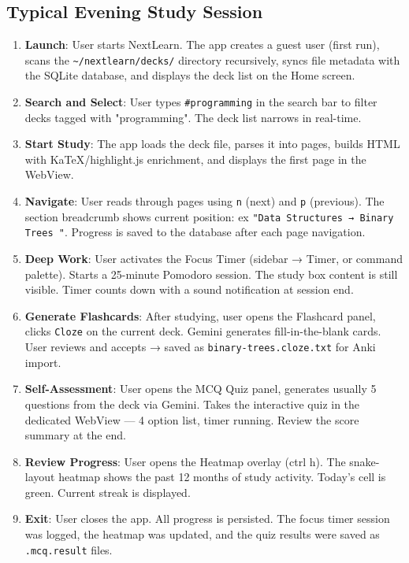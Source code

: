 \documentclass[14pt]{article}
\begin{document}
\subsection{Typical Evening Study Session}
\label{sec:org3392ef2}
\begin{enumerate}
\item \textbf{\textbf{Launch}}: User starts NextLearn. The app creates a guest user
(first run), scans the \texttt{\textasciitilde{}/nextlearn/decks/} directory recursively,
syncs file metadata with the SQLite database, and displays the deck
list on the Home screen.

\item \textbf{\textbf{Search and Select}}: User types \texttt{\#programming} in the search bar
to filter decks tagged with "programming". The deck list narrows
in real-time.

\item \textbf{\textbf{Start Study}}: The app loads the deck file, parses it into pages,
builds HTML with
KaTeX/highlight.js enrichment, and displays the first page in the
WebView.

\item \textbf{\textbf{Navigate}}: User reads through pages using \texttt{n} (next) and \texttt{p}
(previous). The section breadcrumb shows current position: ex
\texttt{"Data Structures → Binary Trees "}. Progress is saved to the
database after each page navigation.

\item \textbf{\textbf{Deep Work}}: User activates the Focus Timer (sidebar → Timer,
or command palette). Starts a 25-minute Pomodoro session. The
study box content is still visible. Timer counts down with a
sound notification at session end.

\item \textbf{\textbf{Generate Flashcards}}: After studying, user opens the Flashcard
panel, clicks \texttt{Cloze} on the current deck. Gemini generates
fill-in-the-blank cards. User reviews and accepts → saved as
\texttt{binary-trees.cloze.txt} for Anki import.

\item \textbf{\textbf{Self-Assessment}}: User opens the MCQ Quiz panel, generates usually
 5 questions from the deck via Gemini. Takes the interactive quiz
in the dedicated WebView — 4 option list, timer running.
Review the score summary at the end.

\item \textbf{\textbf{Review Progress}}: User opens the Heatmap overlay (ctrl h).
The snake-layout heatmap shows the past 12 months of study
activity. Today's cell is green. Current streak is displayed.

\item \textbf{\textbf{Exit}}: User closes the app. All progress is persisted. The
focus timer session was logged, the heatmap was updated, and
the quiz results were saved as \texttt{.mcq.result} files.
\end{enumerate}
\end{document}
